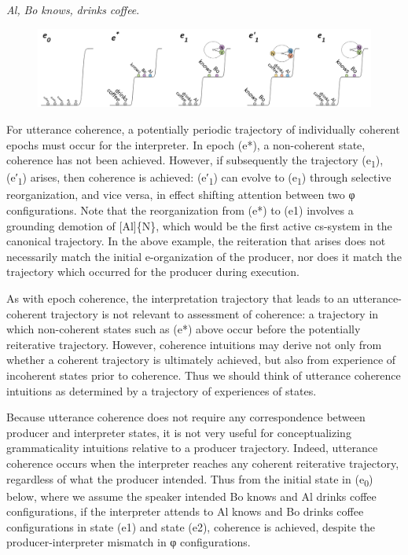 \textit{Al,} \textit{Bo} \textit{knows,} \textit{drinks} \textit{coffee}.

  
\begin{figure}
\includegraphics[width=\textwidth]{figures/Tilsen-img125.png}
\caption{\missingcaption}
\label{fig:}
\end{figure}
 

  For utterance coherence, a potentially periodic trajectory of individually coherent epochs must occur for the interpreter. In epoch (e*), a non-coherent state, coherence has not been achieved. However, if subsequently the trajectory (e\textsubscript{1}), (e′\textsubscript{1}) arises, then coherence is achieved: (e′\textsubscript{1}) can evolve to (e\textsubscript{1}) through selective reorganization, and vice versa, in effect shifting attention between two φ configurations. Note that the reorganization from (e*) to (e1) involves a grounding demotion of [Al]\{N\}, which would be the first active cs-system in the canonical trajectory. In the above example, the reiteration that arises does not necessarily match the initial e-organization of the producer, nor does it match the trajectory which occurred for the producer during execution.

  As with epoch coherence, the interpretation trajectory that leads to an utterance-coherent trajectory is not relevant to assessment of coherence: a trajectory in which non-coherent states such as (e*) above occur before the potentially reiterative trajectory. However, coherence intuitions may derive not only from whether a coherent trajectory is ultimately achieved, but also from experience of incoherent states prior to coherence. Thus we should think of utterance coherence intuitions as determined by a trajectory of experiences of states.

  Because utterance coherence does not require any correspondence between producer and interpreter states, it is not very useful for conceptualizing grammaticality intuitions relative to a producer trajectory. Indeed, utterance coherence occurs when the interpreter reaches any coherent reiterative trajectory, regardless of what the producer intended. Thus from the initial state in (e\textsubscript{0}) below, where we assume the speaker intended {\textbar}Bo knows{\textbar} and {\textbar}Al drinks coffee{\textbar} configurations, if the interpreter attends to {\textbar}Al knows{\textbar} and {\textbar}Bo drinks coffee{\textbar} configurations in state (e1) and state (e2), coherence is achieved, despite the producer-interpreter mismatch in φ configurations.

